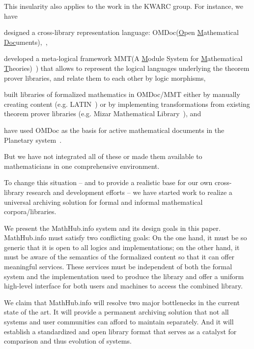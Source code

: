 \documentclass{llncs}
\def\omdoc{\textsf{OMDoc}\xspace}
\def\mmt{\textsf{MMT}\xspace}
\def\sys{\textsf{MathHub.info}\xspace}
\begin{document}
This insularity also applies to the work in the KWARC group. For instance, we have
\begin{inparaenum}[\em i\rm)]
\item designed a cross-library representation language: \omdoc (\underline{O}pen
  \underline{M}athematical \underline{Doc}uments),~\cite{Kohlhase:OMDoc1.2},
\item developed a meta-logical framework \mmt (A \underline{M}odule System for
  \underline{M}athematical \underline{T}heories)~\cite{RabKoh:WSMSML13,CodHorKoh:palai11})
  that allows to represent the logical languages underlying the theorem prover libraries,
  and relate them to each other by logic morphisms,
\item built libraries of formalized mathematics in \omdoc/\mmt either by manually creating content (e.g. LATIN~\cite{CodHorKoh:palai11}) or by implementing transformations from existing theorem prover libraries (e.g. Mizar Mathematical Library~\cite{IanKohRabUrb:tmmliotaa13}), and 
\item have used \omdoc as the basis for active mathematical documents in the Planetary
  system~\cite{Kohlhase:ppte12}.
\end{inparaenum}
But we have not integrated all of these or made them available to mathematicians in one
comprehensive environment.

To change this situation -- and to provide a realistic base for our own cross-library
research and development efforts -- we have started work to realize a universal archiving
solution for formal and informal mathematical corpora/libraries.  

We present the \sys system and its design goals in this paper. \sys must satisfy two
conflicting goals: On the one hand, it must be so generic that it is open to all logics
and implementations; on the other hand, it must be aware of the semantics of the
formalized content so that it can offer meaningful services. These services must be
independent of both the formal system and the implementation used to produce the library
and offer a uniform high-level interface for both users and machines to access the
combined library.

We claim that \sys will resolve two major bottlenecks in the current state of the art. It
will provide a permanent archiving solution that not all systems and user communities can
afford to maintain separately. And it will establish a standardized and open library
format that serves as a catalyst for comparison and thus evolution of systems.
\end{document}
